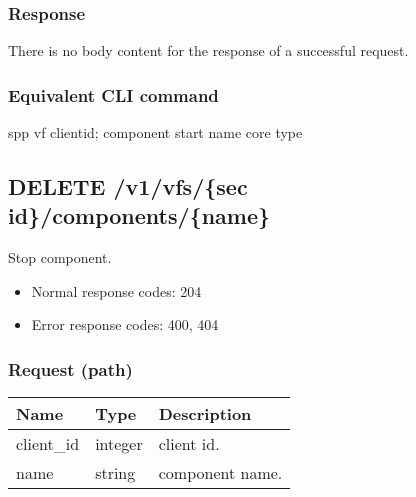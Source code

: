 \documentclass[a4paper,11pt,openany,oneside,english]{sphinxmanual}
\begin{document}
\subsubsection{Response}
\label{\detokenize{api_ref/spp_vf:id3}}
There is no body content for the response of a successful  request.


\subsubsection{Equivalent CLI command}
\label{\detokenize{api_ref/spp_vf:id4}}
\begin{sphinxVerbatim}[commandchars=\\\{\},formatcom=\footnotesize]
spp \PYGZgt{} vf \PYGZob{}client\PYGZus{}id\PYGZcb{}; component start \PYGZob{}name\PYGZcb{} \PYGZob{}core\PYGZcb{} \PYGZob{}type\PYGZcb{}
\end{sphinxVerbatim}


\subsection{DELETE /v1/vfs/\{sec id\}/components/\{name\}}
\label{\detokenize{api_ref/spp_vf:delete-v1-vfs-sec-id-components-name}}
Stop component.
\begin{itemize}
\item {} 
Normal response codes: 204

\item {} 
Error response codes: 400, 404

\end{itemize}


\subsubsection{Request (path)}
\label{\detokenize{api_ref/spp_vf:id5}}

\begin{savenotes}\sphinxattablestart
\centering
{}
\sphinxthecaptionisattop
{}\label{\detokenize{api_ref/spp_vf:id27}}\label{\detokenize{api_ref/spp_vf:table-spp-ctl-spp-vf-del}}
\sphinxaftertopcaption
\begin{tabulary}{\linewidth}[t]{|T|T|T|}
\hline
\sphinxstyletheadfamily 
Name
&\sphinxstyletheadfamily 
Type
&\sphinxstyletheadfamily 
Description
\\
\hline
client\_id
&
integer
&
client id.
\\
\hline
name
&
string
&
component name.
\\
\hline
\end{tabulary}
\par
\sphinxattableend\end{savenotes}
\end{document}
